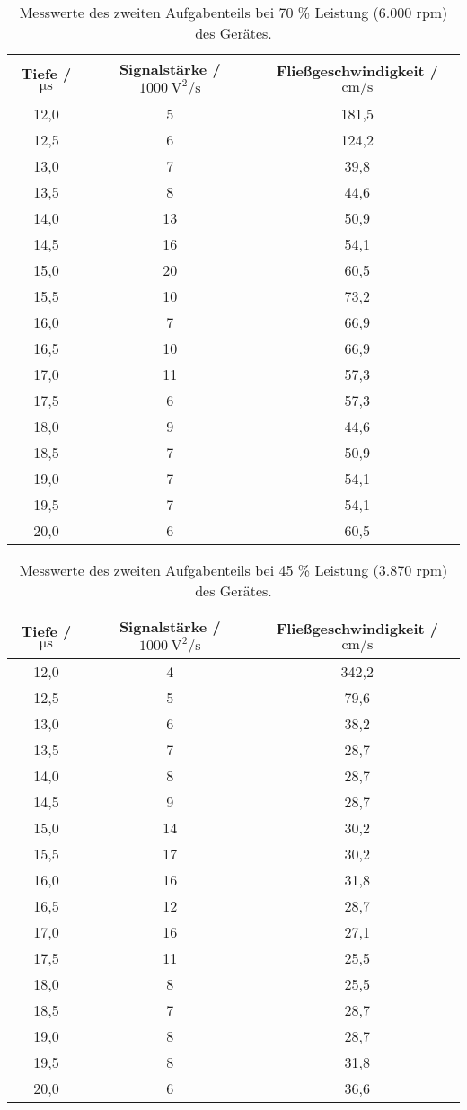 \begin{table}[H]
  \centering
  \caption{Messwerte des zweiten Aufgabenteils bei 70 \% Leistung (6.000 rpm) des Gerätes.}
  \label{tab:Werte1}
  \begin{tabular}{c c c}
    \toprule
    Tiefe / $\si{\micro\second}$ & Signalstärke / $\SI{1000}{\square\volt\per\second}$ & Fließgeschwindigkeit / $\si{\centi\meter\per\second}$ \\
    \midrule
    12,0 & 5 & 181,5 \\
    12,5 & 6 & 124,2 \\
    13,0 & 7 & 39,8 \\
    13,5 & 8 & 44,6 \\
    14,0 & 13 & 50,9 \\
    14,5 & 16 & 54,1 \\
    15,0 & 20  & 60,5 \\
    15,5 & 10 & 73,2 \\
    16,0 & 7 & 66,9 \\
    16,5 & 10 & 66,9 \\
    17,0 & 11 & 57,3 \\
    17,5 & 6 & 57,3 \\
    18,0 & 9 & 44,6 \\
    18,5 & 7 & 50,9 \\
    19,0 & 7 & 54,1 \\
    19,5 & 7 & 54,1 \\
    20,0 & 6 & 60,5 \\
    \bottomrule
  \end{tabular}
\end{table}

\begin{table}[H]
  \centering
  \caption{Messwerte des zweiten Aufgabenteils bei 45 \% Leistung (3.870 rpm) des Gerätes.}
  \label{tab:Werte2}
  \begin{tabular}{c c c}
    \toprule
    Tiefe / $\si{\micro\second}$ & Signalstärke / $\SI{1000}{\square\volt\per\second}$ & Fließgeschwindigkeit / $\si{\centi\meter\per\second}$ \\
    \midrule
    12,0 & 4 & 342,2 \\
    12,5 & 5 & 79,6 \\
    13,0 & 6 & 38,2 \\
    13,5 & 7 & 28,7 \\
    14,0 & 8 & 28,7 \\
    14,5 & 9 & 28,7 \\
    15,0 & 14 & 30,2 \\
    15,5 & 17 & 30,2 \\
    16,0 & 16 & 31,8 \\
    16,5 & 12 & 28,7 \\
    17,0 & 16 & 27,1 \\
    17,5 & 11 & 25,5 \\
    18,0 & 8 & 25,5 \\
    18,5 & 7 & 28,7 \\
    19,0 & 8 & 28,7 \\
    19,5 & 8 & 31,8 \\
    20,0 & 6 & 36,6 \\
    \bottomrule
  \end{tabular}
\end{table}